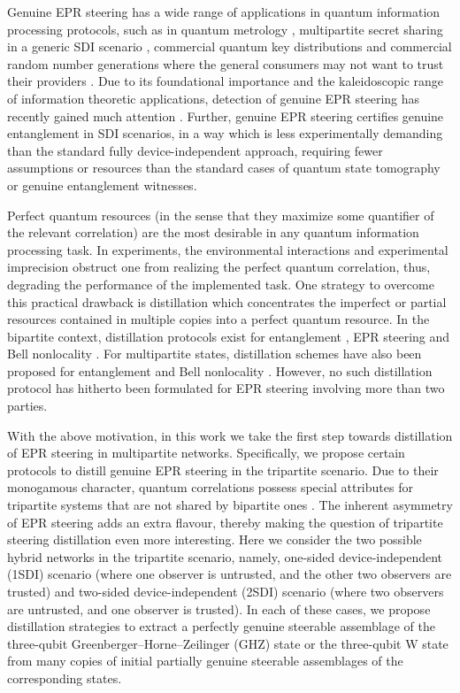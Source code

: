 \documentclass[reprint,superscriptaddress,nofootinbib,amsmath,amssymb,aps,pra,longbibliography]{revtex4-1}
\begin{document}
Genuine EPR steering has a wide range of applications in quantum information processing protocols, such as in quantum metrology \cite{Giovannetti2011,Li15}, multipartite secret sharing in a generic SDI scenario \cite{Armstrong2015}, commercial quantum key distributions and commercial random number generations where the general consumers  may not want to trust their providers \cite{Cavalcanti15}. Due to its foundational importance and the kaleidoscopic range of information theoretic applications, detection of genuine EPR steering has recently gained much attention \cite{Armstrong2015,Mattar2017,Liu2020}. 
Further, genuine EPR steering certifies genuine entanglement in SDI scenarios, in a way which is less experimentally demanding  than the standard fully device-independent approach, requiring fewer assumptions or resources than the standard cases of quantum state tomography or genuine entanglement witnesses. 
 
Perfect quantum resources (in the sense that they maximize some quantifier of the relevant correlation) are the most desirable in any quantum information processing task. In experiments, the environmental interactions and experimental imprecision obstruct one from realizing the  perfect quantum correlation, thus, degrading the performance of the implemented task. One strategy to overcome this practical drawback is distillation which concentrates the imperfect or partial resources contained in multiple copies into a perfect quantum resource. In the bipartite context, distillation protocols exist for entanglement \cite{Bennet96,Horo98,Horo99,Horod99,Horo01}, EPR steering \cite{Nery20,Liu20} and Bell nonlocality \cite{Forster09,Forster11,Peter10,Brunner11,Wu2013,Hyer2013}. For multipartite states, distillation schemes have also been proposed for entanglement \cite{Huang14,Ben08} and Bell nonlocality \cite{Wu10,Ye12,Ebbe2013,Pan2015}. However, no such distillation protocol has hitherto been formulated for EPR steering involving more than two parties.  
 
With the above motivation, in this work we take the first step towards distillation of EPR steering in multipartite networks. Specifically, we propose certain protocols to distill genuine EPR steering in the tripartite scenario. Due to their monogamous character, quantum correlations possess special attributes for tripartite systems that are not shared by bipartite ones \cite{Dey13,Jeba18,DAS201855,Gupta18,Maity20,Gupta21}. The inherent asymmetry of EPR steering adds an extra flavour, thereby making the question of tripartite steering distillation even more interesting. Here we consider the two possible hybrid networks in the tripartite scenario, namely, one-sided device-independent (1SDI) scenario (where one observer is untrusted, and the other two observers are trusted)  and two-sided device-independent (2SDI) scenario (where two observers are untrusted, and one observer is trusted). In each of these cases, we propose distillation strategies to extract a perfectly genuine steerable assemblage of the three-qubit Greenberger–Horne–Zeilinger (GHZ) state or the three-qubit W state from many copies of initial partially genuine steerable assemblages of the corresponding states. 
\end{document}
